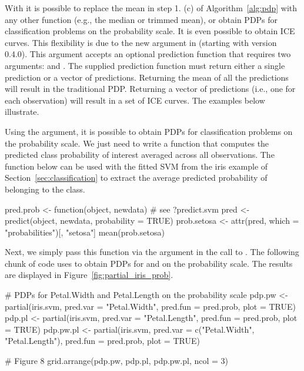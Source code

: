 With  it is possible to replace the mean in step 1. (c) of Algorithm~\ref{alg:pdp} with any other function (e.g., the median or trimmed mean), or obtain PDPs for classification problems on the probability scale. It is even possible to obtain ICE curves. This flexibility is due to the new  argument in  (starting with  version 0.4.0). This argument accepts an optional prediction function that requires two arguments:  and . The supplied prediction function must return either a single prediction or a vector of predictions. Returning the mean of all the predictions will result in the traditional PDP. Returning a vector of predictions (i.e., one for each observation) will result in a set of ICE curves. The examples below illustrate.

Using the  argument, it is possible to obtain PDPs for classification problems on the probability scale. We just need to write a function that computes the predicted class probability of interest averaged across all observations. The function below can be used with the fitted SVM from the iris example of Section~\ref{sec:classification} to extract the average predicted probability of belonging to the  class.
\begin{example}
pred.prob <- function(object, newdata) {  # see ?predict.svm
  pred <- predict(object, newdata, probability = TRUE)
  prob.setosa <- attr(pred, which = "probabilities")[, "setosa"]
  mean(prob.setosa)
}
\end{example}
Next, we simply pass this function via the  argument in the call to . The following chunk of code uses  to obtain PDPs for  and  on the probability scale. The results are displayed in Figure~\ref{fig:partial_iris_prob}.
\begin{example}
# PDPs for Petal.Width and Petal.Length on the probability scale
pdp.pw <- partial(iris.svm, pred.var = "Petal.Width", pred.fun = pred.prob,
                  plot = TRUE)
pdp.pl <- partial(iris.svm, pred.var = "Petal.Length", pred.fun = pred.prob,
                  plot = TRUE)
pdp.pw.pl <- partial(iris.svm, pred.var = c("Petal.Width", "Petal.Length"),
                     pred.fun = pred.prob, plot = TRUE)

# Figure 8
grid.arrange(pdp.pw, pdp.pl, pdp.pw.pl, ncol = 3)
\end{example}

